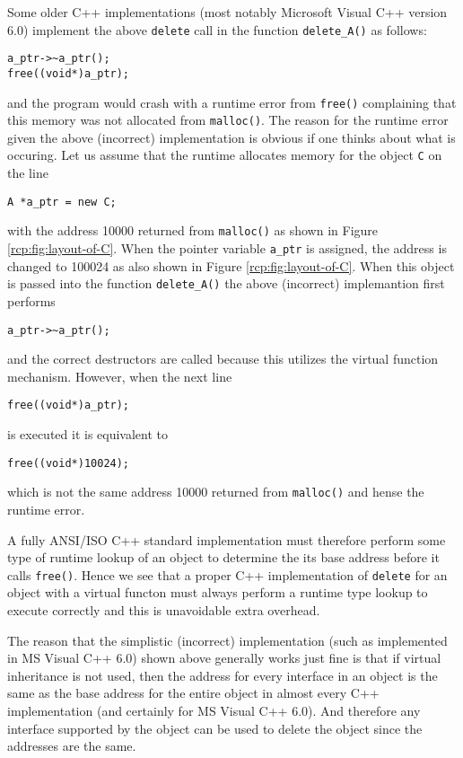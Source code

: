 Some older C++ implementations (most notably Microsoft Visual C++
version 6.0) implement the above \texttt{delete} call in the function
\texttt{delete\_A()} as follows:
%
{\small\begin{verbatim}a_ptr->~a_ptr();
free((void*)a_ptr);
\end{verbatim}}
%
\noindent{}and the program would crash with a runtime error from \texttt{free()}
complaining that this memory was not allocated from \texttt{malloc()}.
The reason for the runtime error given the above (incorrect)
implementation is obvious if one thinks about what is occuring.  Let
us assume that the runtime allocates memory for the object \texttt{C}
on the line
%
{\small\begin{verbatim}
A *a_ptr = new C;
\end{verbatim}}
%
\noindent{}with the address 10000 returned from \texttt{malloc()}
as shown in Figure \ref{rcp:fig:layout-of-C}.  When the pointer
variable \texttt{a\_ptr} is assigned, the address is changed to 100024
as also shown in Figure \ref{rcp:fig:layout-of-C}.  When this object
is passed into the function \texttt{delete\_A()} the above
(incorrect) implemantion first performs
%
{\small\begin{verbatim}
a_ptr->~a_ptr();
\end{verbatim}}
%
\noindent{}and the correct destructors are
called because this utilizes the virtual function mechanism.  However,
when the next line
%
{\small\begin{verbatim}
free((void*)a_ptr);
\end{verbatim}}
%
\noindent{}is executed it is equivalent to
%
{\small\begin{verbatim}
free((void*)10024);
\end{verbatim}}
%
\noindent{}which is not the same address 10000 returned from \texttt{malloc()}
and hense the runtime error.

A fully ANSI/ISO C++ standard implementation must therefore perform
some type of runtime lookup of an object to determine the its base
address before it calls \texttt{free()}.  Hence we see that a proper
C++ implementation of \texttt{delete} for an object with a virtual
functon must always perform a runtime type lookup to execute correctly
and this is unavoidable extra overhead.

The reason that the simplistic (incorrect) implementation (such as
implemented in MS Visual C++ 6.0) shown above generally works just
fine is that if virtual inheritance is not used, then the address for
every interface in an object is the same as the base address for the
entire object in almost every C++ implementation (and certainly for MS
Visual C++ 6.0).  And therefore any interface supported by the object
can be used to delete the object since the addresses are the same.

